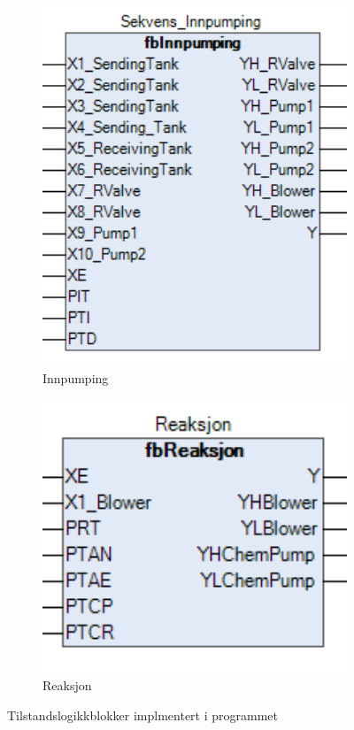 \begin{figure}[htbp]
    \centering
    \begin{subfigure}[b]{0.6\textwidth}
        \centering
        \includegraphics[width=1\textwidth]{Bilder/fbInnpumping.png}
        \caption{Innpumping}\label{fig:fbInnpumping}
    \end{subfigure}
    \hfill
    \begin{subfigure}[b]{0.3\textwidth}
        \centering
        \includegraphics[width=1\textwidth]{Bilder/fbReaksjon.png}
        \caption{Reaksjon}\label{fig:fbReaksjon}
    \end{subfigure}
    \caption{Tilstandslogikkblokker implmentert i programmet}\label{fig:ReaksjonsFasen}
\end{figure}



